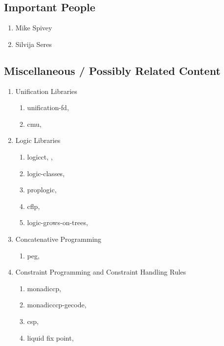 \documentclass[proposal.tex]{subfiles}
\begin{document}
\subsection{Important People}
\begin{enumerate}
\item Mike Spivey 
\item Silvija Seres
\end{enumerate}

\subsection{Miscellaneous / Possibly Related Content}
\begin{enumerate}
\item Unification Libraries
\begin{enumerate}
\item unification-fd, \cite{unification-fd-lib}

\item cmu, \cite{cmu-lib}
\end{enumerate}

\item Logic Libraries
\begin{enumerate}
\item logicct, \cite{logict-lib}, \cite{logict2-lib}

\item logic-classes, \cite{logic-classes}

\item proplogic, \cite{proplogic-lib}

\item cflp, \cite{cflp-lib}

\item logic-grows-on-trees, \cite{logic-grows-on-trees-lib}
\end{enumerate}

\item Concatenative Programming
\begin{enumerate}
\item peg, \cite{peg-lib}
\end{enumerate} 

\item Constraint Programming and Constraint Handling Rules
\begin{enumerate}
	\item monadiccp, \cite{monadiccp-lib}
	\item monadicccp-gecode, \cite{monadiccp-gecode-lib}
	\item csp, \cite{csp-lib}
	\item liquid fix point, \cite{liquid-fix-point-lib}
\end{enumerate}
\end{enumerate}
\end{document}
